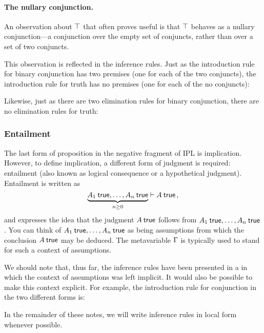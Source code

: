 \documentclass[12pt]{article}
\begin{document}
\paragraph{The nullary conjunction.}\label{sec:nullary-conjunction}
An observation about $\top$ that often proves useful is that $\top$ behaves as a nullary conjunction---a conjunction over the empty set of conjuncts, rather than over a set of two conjuncts.

This observation is reflected in the inference rules.
Just as the introduction rule for binary conjunction has two premises (one for each of the two conjuncts), the introduction rule for truth has no premises (one for each of the no conjuncts):
Likewise, just as there are two elimination rules for binary conjunction, there are no elimination rules for truth:

\subsubsection{Entailment}\label{sec:entailment}

The last form of proposition in the negative fragment of \ac{IPL} is implication.
However, to define implication, a different form of judgment is required: entailment (also known as logical consequence or a hypothetical judgment).
Entailment is written as
\begin{equation*}
  \underbrace{A_1 \true, \dotsc, A_n \true}_{n \geq 0} \entails A \true \,,
\end{equation*}
and expresses the idea that the judgment $A \true$ follows from $A_1 \true, \dotsc, A_n \true$.
You can think of $A_1 \true, \dotsc, A_n \true$ as being assumptions from which the conclusion $A \true$ may be deduced.
The metavariable $\Gamma$ is typically used to stand for such a context of assumptions.

We should note that, thus far, the inference rules have been presented in a  in which the context of assumptions was left implicit.
It would also be possible to make this context explicit.
For example, the introduction rule for conjunction in the two different forms is:
In the remainder of these notes, we will write inference rules in local form whenever possible.
\end{document}
